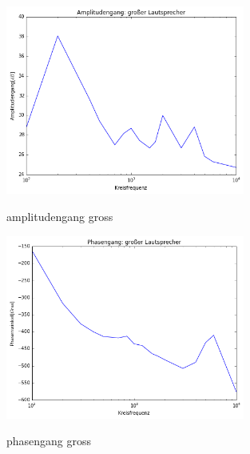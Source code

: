 \documentclass[TGAI_Laborbericht.tex]{subfiles}
\begin{document}
\begin{figure}[H]
	\includegraphics[width=0.7\textwidth]{media/amplitudengang_gross.png}
	\label{amplitudengang gross}
	\caption{amplitudengang gross}
\end{figure}

\begin{figure}[H]
	\includegraphics[width=0.7\textwidth]{media/phasengang_gross.png}
	\label{phasengang gross}
	\caption{phasengang gross}
\end{figure}
\end{document}

